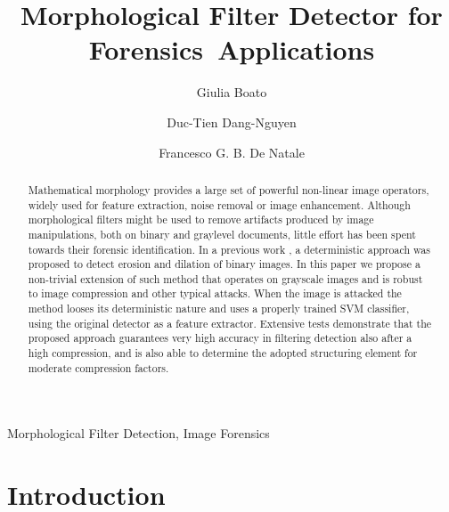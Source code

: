 \documentclass[review]{elsarticle}
\begin{document}
\begin{frontmatter}

\title{Morphological Filter Detector for Forensics~Applications}

\author{Giulia Boato}
\address{University of Trento, Italy}


\author{Duc-Tien Dang-Nguyen}
\address{University of Bergen, Norway}

\author{Francesco G. B. De Natale}
\address{University of Trento, Italy}

\begin{abstract}
Mathematical morphology provides a large set of powerful non-linear image operators, widely used for feature extraction, noise removal or image enhancement. Although morphological filters might be used to remove artifacts produced by image manipulations, both on binary and graylevel documents, little effort has been spent towards their forensic identification. In a previous work \cite{de2017detecting}, a deterministic approach was proposed to detect erosion and dilation of binary images. In this paper we propose a non-trivial extension of such method that operates on grayscale images and is robust to image compression and other typical attacks. When the image is attacked the method looses its deterministic nature and uses a properly trained SVM classifier, using the original detector as a feature extractor. Extensive tests demonstrate that the proposed approach guarantees very high accuracy in filtering detection also after a high compression, and is also able to determine the adopted structuring element for moderate compression factors.
\end{abstract}

\begin{keyword}
Morphological Filter Detection, Image Forensics 
\end{keyword}

\end{frontmatter}

\linenumbers

\section{Introduction}
\label{sec:intro}
\end{document}
